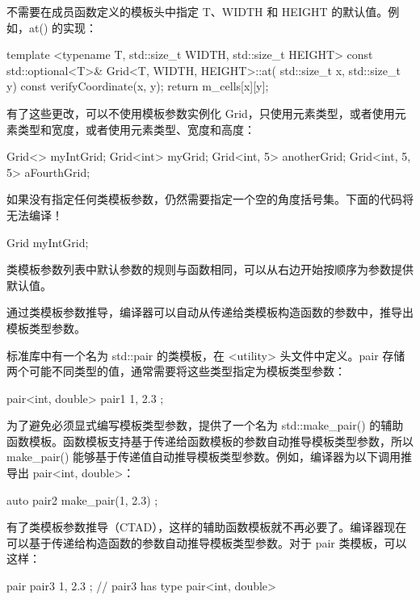 不需要在成员函数定义的模板头中指定 T、WIDTH 和 HEIGHT 的默认值。例如，at() 的实现：

\begin{cpp}
template <typename T, std::size_t WIDTH, std::size_t HEIGHT>
const std::optional<T>& Grid<T, WIDTH, HEIGHT>::at(
    std::size_t x, std::size_t y) const
{
    verifyCoordinate(x, y);
    return m_cells[x][y];
}
\end{cpp}

有了这些更改，可以不使用模板参数实例化 Grid，只使用元素类型，或者使用元素类型和宽度，或者使用元素类型、宽度和高度：

\begin{cpp}
Grid<> myIntGrid;
Grid<int> myGrid;
Grid<int, 5> anotherGrid;
Grid<int, 5, 5> aFourthGrid;
\end{cpp}

如果没有指定任何类模板参数，仍然需要指定一个空的角度括号集。下面的代码将无法编译！

\begin{cpp}
Grid myIntGrid;
\end{cpp}

类模板参数列表中默认参数的规则与函数相同，可以从右边开始按顺序为参数提供默认值。


通过类模板参数推导，编译器可以自动从传递给类模板构造函数的参数中，推导出模板类型参数。

标准库中有一个名为 std::pair 的类模板，在 <utility> 头文件中定义。pair 存储两个可能不同类型的值，通常需要将这些类型指定为模板类型参数：

\begin{cpp}
pair<int, double> pair1 { 1, 2.3 };
\end{cpp}

为了避免必须显式编写模板类型参数，提供了一个名为 std::make\_pair() 的辅助函数模板。函数模板支持基于传递给函数模板的参数自动推导模板类型参数，所以make\_pair() 能够基于传递值自动推导模板类型参数。例如，编译器为以下调用推导出 pair<int, double>：

\begin{cpp}
auto pair2 { make_pair(1, 2.3) };
\end{cpp}

有了类模板参数推导（CTAD），这样的辅助函数模板就不再必要了。编译器现在可以基于传递给构造函数的参数自动推导模板类型参数。对于 pair 类模板，可以这样：

\begin{cpp}
pair pair3 { 1, 2.3 }; // pair3 has type pair<int, double>
\end{cpp}

